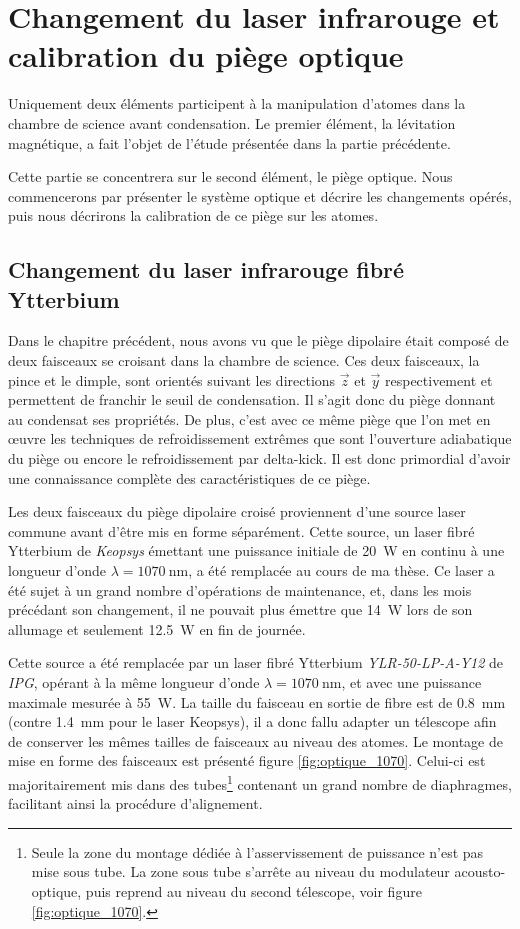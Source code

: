 \section{Changement du laser infrarouge et calibration du piège optique}
Uniquement deux éléments participent à la manipulation d'atomes dans la chambre de science avant condensation. Le premier élément, la lévitation magnétique, a fait l'objet de l'étude présentée dans la partie précédente. 

Cette partie se concentrera sur le second élément, le piège optique. Nous commencerons par présenter le système optique et décrire les changements opérés, puis nous décrirons la calibration de ce piège sur les atomes.

\subsection{Changement du laser infrarouge fibré Ytterbium }
Dans le chapitre précédent, nous avons vu que le piège dipolaire était composé de deux faisceaux se croisant dans la chambre de science. Ces deux faisceaux, la pince et le dimple, sont orientés suivant les directions $\vec{z}$ et $\vec{y}$ respectivement et permettent de franchir le seuil de condensation. Il s'agit donc du piège donnant au condensat ses propriétés. De plus, c'est avec ce même piège que l'on met en œuvre les techniques de refroidissement extrêmes que sont l'ouverture adiabatique du piège ou encore le refroidissement par delta-kick. Il est donc primordial d'avoir une connaissance complète des caractéristiques de ce piège.



Les deux faisceaux du piège dipolaire croisé proviennent d'une source laser commune avant d'être mis en forme séparément. Cette source, un laser fibré Ytterbium de \emph{Keopsys} émettant une puissance initiale de \SI{20}{\watt} en continu à une longueur d'onde $\lambda=\SI{1070}{\nano\metre}$, a été remplacée au cours de ma thèse. Ce laser a été sujet à un grand nombre d'opérations de maintenance, et, dans les mois précédant son changement, il ne pouvait plus émettre que \SI{14}{\watt} lors de son allumage et seulement \SI{12.5}{\watt} en fin de journée.
 
Cette source a été remplacée par un laser fibré Ytterbium \emph{YLR-50-LP-A-Y12} de \emph{IPG}, opérant à la même longueur d'onde $\lambda=\SI{1070}{\nano\metre}$, et avec une puissance maximale mesurée à \SI{55}{\watt}. La taille du faisceau en sortie de fibre est de \SI{0.8}{\milli\metre} (contre \SI{1.4}{\milli\metre} pour le laser Keopsys), il a donc fallu adapter un télescope afin de conserver les mêmes tailles de faisceaux au niveau des atomes. Le montage de mise en forme des faisceaux est présenté figure \ref{fig:optique_1070}. Celui-ci est majoritairement mis dans des tubes\footnote{Seule la zone du montage dédiée à l'asservissement de puissance n'est pas mise sous tube. La zone sous tube s'arrête au niveau du modulateur acousto-optique, puis reprend au niveau du second télescope, voir figure \ref{fig:optique_1070}.} contenant un grand nombre de diaphragmes, facilitant ainsi la procédure d'alignement.

